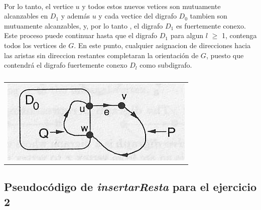 \paragraph{}
Por lo tanto, el vertice $u$ y todos estos nuevos vetices son mutuamente alcanzables en $D_1$ y además $u$ y cada vectice del digrafo $D_0$ tambien son mutuamente alcanzables, y, por lo tanto , el digrafo $D_1$ es fuertemente conexo. Este proceso puede continuar hasta que el digrafo $D_1$ para algun $l$ $\geq$ 1, contenga todos los vertices de $G$. En este punto, cualquier asignacion de direcciones hacia las aristas sin direccion restantes completaran la orientación de $G$, puesto que contendrá el digrafo fuertemente conexo $D_l$ como subdigrafo.



	\begin{table}[h!] %
		\centering %
			\begin{tabular}{c}
				\includegraphics[scale=0.7]{./otros/figura3.jpg} 

				\end{tabular}
				\caption{} %
				\label{} %
	\end{table}

\subsection{Pseudocódigo de \textit{insertarResta} para el ejercicio 2}
\label{PseudoInsResta}